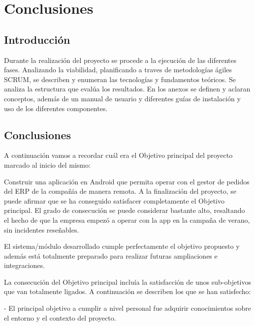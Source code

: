 \chapter{Conclusiones}


\section{Introducción}

Durante la realización del proyecto se procede a la ejecución de las diferentes fases.  Analizando la viabilidad, planificando a traves de metodologías ágiles SCRUM, se describen  y enumeran las tecnologías y fundamentos teóricos. Se analiza la estructura que evalúa los resultados. En los anexos se definen y aclaran conceptos, además de un manual de usuario y diferentes guías  de instalación y uso de los diferentes componentes. 

\section{Conclusiones}

A continuación vamos a recordar cuál era el Objetivo principal del proyecto marcado al inicio del mismo: 

Construir una aplicación en Android que permita operar con el gestor de pedidos del ERP de la compañía de manera remota. A la finalización del proyecto, se puede afirmar que se ha conseguido satisfacer completamente el Objetivo principal. El grado de consecución se puede considerar bastante alto, resaltando el hecho de que la empresa empezó a operar con la app en la campaña de verano, sin incidentes reseñables. 

El sistema/módulo desarrollado cumple perfectamente el objetivo propuesto y además está totalmente preparado para realizar futuras ampliaciones e integraciones. 

La consecución del Objetivo principal incluía la satisfacción de unos sub-objetivos que van totalmente ligados. A continuación se describen los que se han satisfecho: 

- El principal objetivo a cumplir a nivel personal fue adquirir conocimientos sobre el entorno y el contexto del proyecto.

